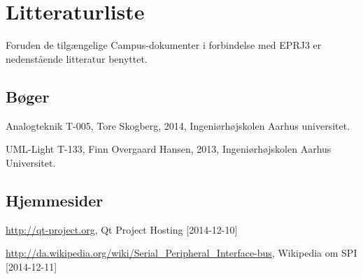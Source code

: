 \chapter{Litteraturliste}
Foruden de tilgængelige Campus-dokumenter i forbindelse med EPRJ3 er nedenstående litteratur benyttet. 

\section{Bøger}
Analogteknik T-005, Tore Skogberg, 2014, Ingeniørhøjskolen Aarhus universitet.

UML-Light T-133, Finn Overgaard Hansen, 2013, Ingeniørhøjskolen Aarhus Universitet.

\section{Hjemmesider}

\url{http://qt-project.org}, Qt Project Hosting [2014-12-10]

\url{http://da.wikipedia.org/wiki/Serial_Peripheral_Interface-bus}, Wikipedia om SPI [2014-12-11]
